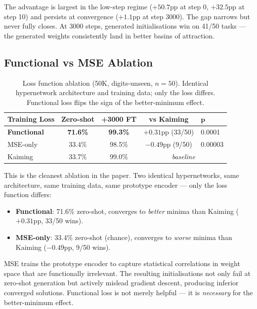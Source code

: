 \documentclass[11pt,a4paper]{article}
\begin{document}
The advantage is largest in the low-step regime ($+50.7$pp at step 0, $+32.5$pp at step 10) and persists at convergence ($+1.1$pp at step 3000). The gap narrows but never fully closes. At 3000 steps, generated initialisations win on 41/50 tasks --- the generated weights consistently land in better basins of attraction.

\subsection{Functional vs MSE Ablation}

\begin{table}[H]
\centering
\caption{Loss function ablation (50K, digits-unseen, $n = 50$). Identical hypernetwork architecture and training data; only the loss differs. Functional loss flips the sign of the better-minimum effect.}
\label{tab:mse_ablation}
\begin{tabular}{lcccl}
\toprule
\textbf{Training Loss} & \textbf{Zero-shot} & \textbf{+3000 FT} & \textbf{vs Kaiming} & $\boldsymbol{p}$ \\
\midrule
\textbf{Functional} & \textbf{71.6\%} & \textbf{99.3\%} & $+0.31$pp (33/50) & 0.0001 \\
MSE-only & 33.4\% & 98.5\% & $-0.49$pp (9/50) & 0.00003 \\
Kaiming & 33.7\% & 99.0\% & \multicolumn{2}{c}{\textit{baseline}} \\
\bottomrule
\end{tabular}
\end{table}

This is the cleanest ablation in the paper. Two identical hypernetworks, same architecture, same training data, same prototype encoder --- only the loss function differs:
\begin{itemize}[noitemsep]
    \item \textbf{Functional}: 71.6\% zero-shot, converges to \emph{better} minima than Kaiming ($+0.31$pp, 33/50 wins).
    \item \textbf{MSE-only}: 33.4\% zero-shot (chance), converges to \emph{worse} minima than Kaiming ($-0.49$pp, 9/50 wins).
\end{itemize}

MSE trains the prototype encoder to capture statistical correlations in weight space that are functionally irrelevant. The resulting initialisations not only fail at zero-shot generation but actively mislead gradient descent, producing inferior converged solutions. Functional loss is not merely helpful --- it is \emph{necessary} for the better-minimum effect.
\end{document}
